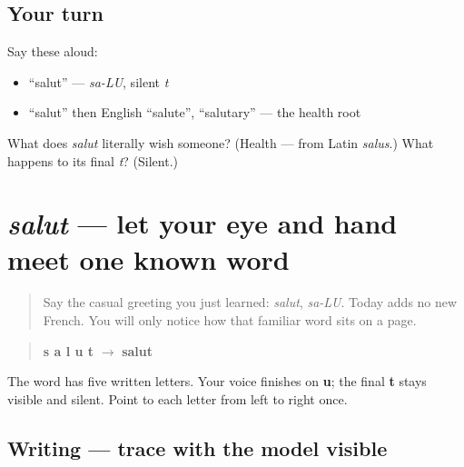 \subsection*{Your turn}
Say these aloud:

\begin{itemize}
\raggedright
  \item \textquotedblleft{}salut\textquotedblright{} — \emph{sa-LU}, silent \emph{t}
  \item \textquotedblleft{}salut\textquotedblright{} then English \textquotedblleft{}salute\textquotedblright{}, \textquotedblleft{}salutary\textquotedblright{} — the health root
\end{itemize}

\begin{tcolorbox}[breakable,colback=teal!4,colframe=teal!35!black,title={Before you move on}]
What does \emph{salut} literally wish someone? (Health — from Latin \emph{salus}.) What happens to its final \emph{t}? (Silent.)
\end{tcolorbox}
\section[salut]{\emph{salut} — let your eye and hand meet one known word}

\label{lesson:FR-W01-salut-observe}



\begin{quote}
Say the casual greeting you just learned: \emph{salut}, \emph{sa-LU}. Today adds no new French. You will only notice how that familiar word sits on a page.
\end{quote}

\begin{grammarlens}[title={What you've built — one spelling}]
\begin{quote}
\textbf{s a l u t} $\to$ \textbf{salut}
\end{quote}

The word has five written letters. Your voice finishes on \textbf{u}; the final \textbf{t} stays visible and silent. Point to each letter from left to right once.
\end{grammarlens}

\subsection*{Writing — trace with the model visible}

